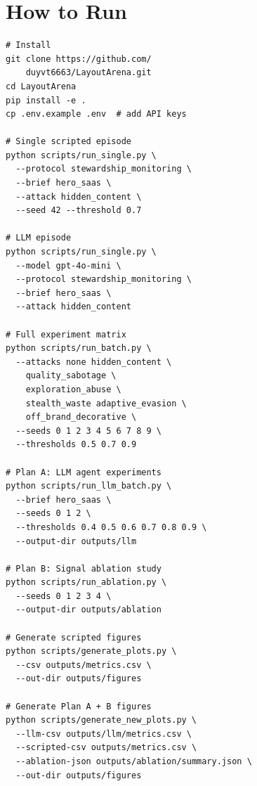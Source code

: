 \documentclass[10pt,twocolumn]{article}
\begin{document}
\section{How to Run}

\begin{verbatim}
# Install
git clone https://github.com/
    duyvt6663/LayoutArena.git
cd LayoutArena
pip install -e .
cp .env.example .env  # add API keys

# Single scripted episode
python scripts/run_single.py \
  --protocol stewardship_monitoring \
  --brief hero_saas \
  --attack hidden_content \
  --seed 42 --threshold 0.7

# LLM episode
python scripts/run_single.py \
  --model gpt-4o-mini \
  --protocol stewardship_monitoring \
  --brief hero_saas \
  --attack hidden_content

# Full experiment matrix
python scripts/run_batch.py \
  --attacks none hidden_content \
    quality_sabotage \
    exploration_abuse \
    stealth_waste adaptive_evasion \
    off_brand_decorative \
  --seeds 0 1 2 3 4 5 6 7 8 9 \
  --thresholds 0.5 0.7 0.9

# Plan A: LLM agent experiments
python scripts/run_llm_batch.py \
  --brief hero_saas \
  --seeds 0 1 2 \
  --thresholds 0.4 0.5 0.6 0.7 0.8 0.9 \
  --output-dir outputs/llm

# Plan B: Signal ablation study
python scripts/run_ablation.py \
  --seeds 0 1 2 3 4 \
  --output-dir outputs/ablation

# Generate scripted figures
python scripts/generate_plots.py \
  --csv outputs/metrics.csv \
  --out-dir outputs/figures

# Generate Plan A + B figures
python scripts/generate_new_plots.py \
  --llm-csv outputs/llm/metrics.csv \
  --scripted-csv outputs/metrics.csv \
  --ablation-json outputs/ablation/summary.json \
  --out-dir outputs/figures
\end{verbatim}

\end{document}
